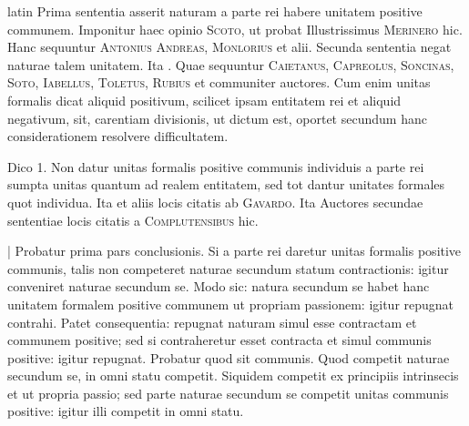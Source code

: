 \begin{otherlanguage*}{latin}
\pstart
Prima sententia asserit naturam a parte rei habere unitatem positive communem. Imponitur haec opinio \textsc{Scoto}, ut probat Illustrissimus \textsc{Merinero}\index[persons]{} hic. Hanc sequuntur \textsc{Antonius Andreas}, \textsc{Monlorius} et alii. Secunda sententia negat naturae talem unitatem. Ita . Quae sequuntur \textsc{Caietanus}, \textsc{Capreolus}, \textsc{Soncinas}, \textsc{Soto}, \textsc{Iabellus}, \textsc{Toletus}, \textsc{Rubius} et communiter auctores. Cum enim unitas formalis dicat aliquid positivum, scilicet ipsam entitatem rei et aliquid negativum, sit, carentiam divisionis, ut dictum est, oportet secundum hanc considerationem resolvere difficultatem. 
\pend

\pstart
Dico 1. Non datur unitas formalis positive communis individuis a parte rei sumpta unitas quantum ad realem entitatem, sed tot dantur unitates formales quot individua. Ita  et aliis locis citatis ab \textsc{Gavardo}. Ita Auctores secundae sententiae locis citatis a \textsc{Complutensibus}\index[persons]{} hic. 
\pend

\pstart
\textnormal{|} Probatur prima pars conclusionis. Si a parte rei daretur unitas formalis positive communis, talis non competeret naturae secundum statum contractionis:
igitur conveniret naturae secundum se. Modo sic:
natura secundum se habet hanc unitatem formalem positive communem ut propriam passionem:
igitur repugnat contrahi. Patet consequentia:
repugnat naturam simul esse contractam et communem positive; sed si contraheretur esset contracta et simul communis positive:
igitur repugnat. Probatur quod sit communis. Quod competit naturae secundum se, in omni statu competit. Siquidem competit ex principiis intrinsecis et ut propria passio; sed parte naturae secundum se competit unitas communis positive:
igitur illi competit in omni statu. 
\pend


\end{otherlanguage*}
